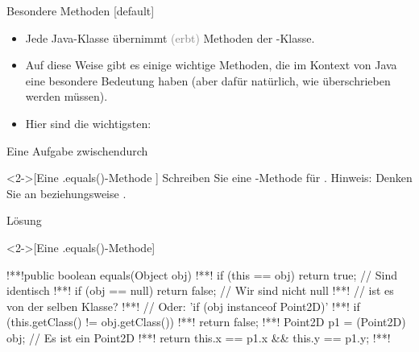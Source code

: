 \begin{frame}{Besondere Methoden}
[default]%
\begin{itemize}[<+(1)->]
    \widei
    \item Jede Java-Klasse übernimmt \textcolor{gray}{(erbt)} Methoden der -Klasse.
    \item Auf diese Weise gibt es einige wichtige Methoden,\pause{} die im Kontext von Java eine besondere Bedeutung haben\pause{} (aber dafür natürlich, wie  überschrieben werden müssen).
    \item Hier sind die wichtigsten:
\end{itemize}
\end{frame}

\ifull
\begin{frame}[c]{Eine Aufgabe zwischendurch}
    \begin{exercise}<2->[Eine .equals()-Methode ]
        Schreiben Sie eine -Methode für .\pause{} Hinweis: Denken Sie an  beziehungsweise .
    \end{exercise}
\end{frame}

\begin{frame}[c,fragile]{Lösung}
    \begin{solve}<2->[Eine .equals()-Methode]
\begin{plainjava}
!**!public boolean equals(Object obj) {
!**!    if (this == obj) return true; // Sind identisch
!**!    if (obj == null) return false; // Wir sind nicht null
!**!    // ist es von der selben Klasse?
!**!    // Oder: 'if (obj instanceof Point2D)'
!**!    if (this.getClass() != obj.getClass())
!**!        return false;
!**!    Point2D p1 = (Point2D) obj; // Es ist ein Point2D
!**!    return this.x == p1.x && this.y == p1.y;
!**!}
\end{plainjava}
    \end{solve}
\end{frame}
\fi

